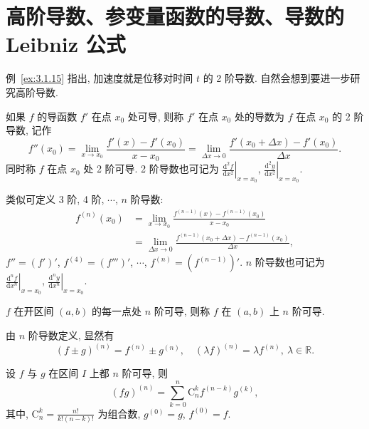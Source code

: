 \section{高阶导数、参变量函数的导数、导数的 Leibniz 公式}\label{sec:3.2}

例~\ref{ex:3.1.15} 指出, 加速度就是位移对时间 $t$ 的 2 阶导数. 自然会想到要进一步研究高阶导数.

\begin{definition}\label{def:3.2.1}
如果 $f$ 的导函数 $f'$ 在点 $x_0$ 处可导, 则称 $f'$ 在点 $x_0$ 处的导数为 $f$ 在点 $x_0$ 的 2 阶导数, 记作
\[
f''(x_0) = \lim_{x\to x_0}\frac{f'(x) - f'(x_0)}{x - x_0} = \lim_{\Delta x\to0}\frac{f'(x_0+\Delta x) - f'(x_0)}{\Delta x}.
\]
同时称 $f$ 在点 $x_0$ 处 2 阶可导. 2 阶导数也可记为 $\left.\frac{\mathrm{d}^{2}f}{\mathrm{d}x^{2}}\right|_{x=x_0}$, $\left.\frac{\mathrm{d}^{2}y}{\mathrm{d}x^{2}}\right|_{x=x_0}$.

类似可定义 3 阶, 4 阶, $\cdots$, $n$ 阶导数:
\[
\begin{aligned}
f^{(n)}(x_0) &= \lim_{x\to x_0}\frac{f^{(n-1)}(x) - f^{(n-1)}(x_0)}{x - x_0}\\
&= \lim_{\Delta x\to0}\frac{f^{(n-1)}(x_0+\Delta x) - f^{(n-1)}(x_0)}{\Delta x},
\end{aligned}
\]
$f'' = (f')'$, $f^{(4)} = (f''')'$, $\cdots$, $f^{(n)} = (f^{(n-1)})'$. $n$ 阶导数也可记为 $\left.\frac{\mathrm{d}^{n}f}{\mathrm{d}x^{n}}\right|_{x=x_0}$, $\left.\frac{\mathrm{d}^{n}y}{\mathrm{d}x^{n}}\right|_{x=x_0}$.

$f$ 在开区间 $(a,b)$ 的每一点处 $n$ 阶可导, 则称 $f$ 在 $(a,b)$ 上 $n$ 阶可导.
\end{definition}

由 $n$ 阶导数定义, 显然有
\[
(f \pm g)^{(n)} = f^{(n)} \pm g^{(n)},\quad (\lambda f)^{(n)} = \lambda f^{(n)},\ \lambda \in \mathbb{R}.
\]

\begin{theorem}[Leibniz]\label{thm:3.2.1}
设 $f$ 与 $g$ 在区间 $I$ 上都 $n$ 阶可导, 则
\[
(fg)^{(n)} = \sum_{k=0}^{n}\mathrm{C}_{n}^{k}f^{(n-k)}g^{(k)},
\]
其中, $\mathrm{C}_{n}^{k} = \frac{n!}{k!(n-k)!}$ 为组合数, $g^{(0)} = g$, $f^{(0)} = f$.
\end{theorem}

